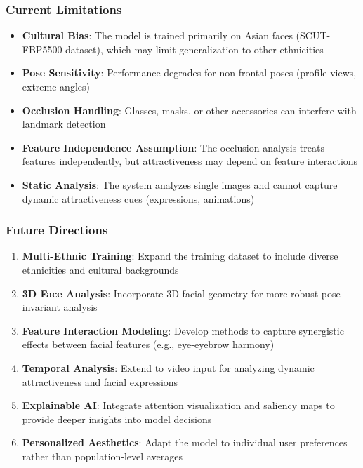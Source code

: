 \subsubsection{Current Limitations}

\begin{itemize}
    \item \textbf{Cultural Bias}: The model is trained primarily on Asian faces (SCUT-FBP5500 dataset), which may limit generalization to other ethnicities
    
    \item \textbf{Pose Sensitivity}: Performance degrades for non-frontal poses (profile views, extreme angles)
    
    \item \textbf{Occlusion Handling}: Glasses, masks, or other accessories can interfere with landmark detection
    
    \item \textbf{Feature Independence Assumption}: The occlusion analysis treats features independently, but attractiveness may depend on feature interactions
    
    \item \textbf{Static Analysis}: The system analyzes single images and cannot capture dynamic attractiveness cues (expressions, animations)
\end{itemize}

\subsubsection{Future Directions}

\begin{enumerate}
    \item \textbf{Multi-Ethnic Training}: Expand the training dataset to include diverse ethnicities and cultural backgrounds
    
    \item \textbf{3D Face Analysis}: Incorporate 3D facial geometry for more robust pose-invariant analysis
    
    \item \textbf{Feature Interaction Modeling}: Develop methods to capture synergistic effects between facial features (e.g., eye-eyebrow harmony)
    
    \item \textbf{Temporal Analysis}: Extend to video input for analyzing dynamic attractiveness and facial expressions
    
    \item \textbf{Explainable AI}: Integrate attention visualization and saliency maps to provide deeper insights into model decisions
    
    \item \textbf{Personalized Aesthetics}: Adapt the model to individual user preferences rather than population-level averages
\end{enumerate}

